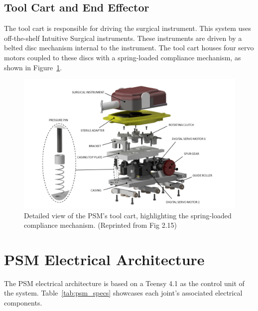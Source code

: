 \subsection{Tool Cart and End Effector}
The tool cart is responsible for driving the surgical instrument. This system uses off-the-shelf Intuitive Surgical instruments. These instruments are driven by a belted disc mechanism internal to the instrument. The tool cart houses four servo motors coupled to these discs with a spring-loaded compliance mechanism, as shown in Figure~\ref{fig:tool_cart_detailed}.

\begin{figure}[H]
    \centering
    \includegraphics[width=1.0\linewidth]{figures/tool_cart_detailed.png}
    \caption{Detailed view of the PSM's tool cart, highlighting the spring-loaded compliance mechanism. (Reprinted from \cite{walder2022design} Fig 2.15)}
    \label{fig:tool_cart_detailed}
\end{figure}



\section{PSM Electrical Architecture}

The PSM electrical architecture is based on a Teensy 4.1 as the control unit of the system. Table~\ref{tab:psm_specs} showcases each joint's associated electrical components.

